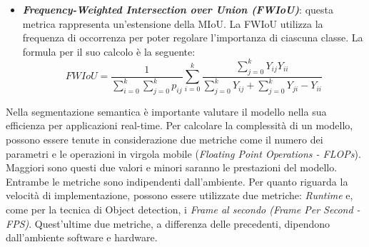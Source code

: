 \begin{itemize}
    \item {\bfseries{\emph{Frequency-Weighted Intersection over Union (FWIoU)}}}: questa metrica 
    rappresenta un'estensione della MIoU. La FWIoU utilizza la frequenza 
    di occorrenza per poter regolare l'importanza di ciascuna classe. La formula 
    per il suo calcolo è la seguente:
    \begin{equation}
        FWIoU = \frac{1}{\sum_{i=0}^k\sum_{j=0}^kp_{ij}}\sum_{i=0}^k\frac{\sum_{j=0}^kY_{ij}Y_{ii}}{\sum_{j=0}^kY_{ij}+\sum_{j=0}^kY_{ji}-Y_{ii}}
    \end{equation}
\end{itemize}
Nella segmentazione semantica è importante valutare il modello nella sua efficienza 
per applicazioni real-time. Per calcolare la complessità di un modello, possono 
essere tenute in considerazione due metriche come il numero dei parametri e le 
operazioni in virgola mobile (\emph{Floating Point Operations - FLOPs}). Maggiori 
sono questi due valori e minori saranno le prestazioni del modello. Entrambe 
le metriche sono indipendenti dall'ambiente. Per quanto riguarda la velocità di 
implementazione, possono essere utilizzate due metriche: \emph{Runtime} e, come per 
la tecnica di Object detection, i \emph{Frame al secondo (Frame Per Second - FPS)}. 
Quest'ultime due metriche, a differenza delle precedenti, dipendono dall'ambiente 
software e hardware.

